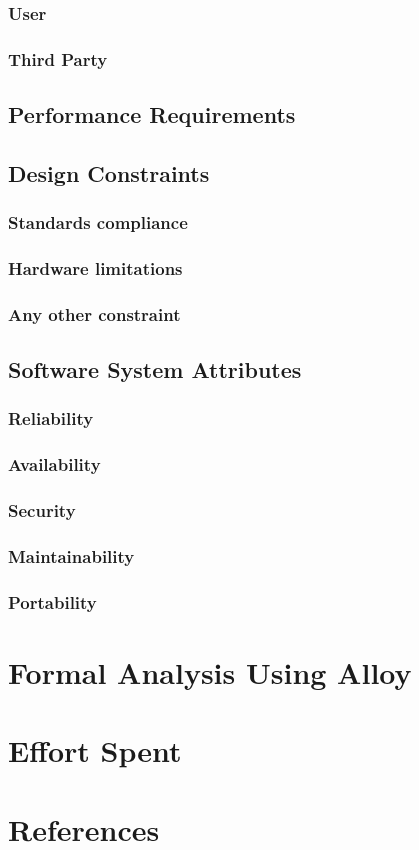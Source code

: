 \documentclass[12pt]{article}
\begin{document}
        \subsubsection{User}
            
        \subsubsection{Third Party}
            
    \subsection{Performance Requirements}
    \subsection{Design Constraints}
        \subsubsection{Standards compliance}
        \subsubsection{Hardware limitations}
        \subsubsection{Any other constraint}
    \subsection{Software System Attributes}
        \subsubsection{Reliability}
        \subsubsection{Availability}
        \subsubsection{Security}
        \subsubsection{Maintainability}
        \subsubsection{Portability}

\newpage
\section{Formal Analysis Using Alloy}
\section{Effort Spent}
    
\section{References}
\end{document}
